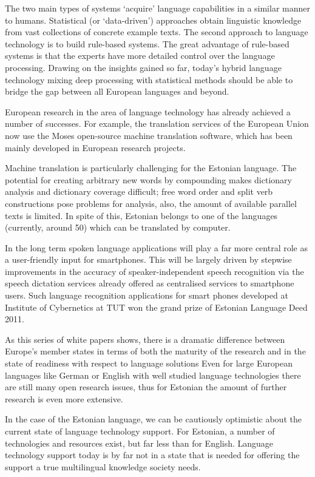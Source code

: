 \begin{multicols}{2}
The two main types of systems ‘acquire’ language capabilities in a similar manner to humans. Statistical (or ‘data-driven’) approaches obtain linguistic knowledge from vast collections of concrete example texts.  The second approach to language technology is to build rule-based systems. The great advantage of rule-based systems is that the experts have more detailed control over the language processing.  Drawing on the insights gained so far, today’s hybrid language technology mixing deep processing with statistical methods should be able to bridge the gap between all European languages and beyond.

European research in the area of language technology has already achieved a number of successes. For example, the translation services of the European Union now use the Moses open-source machine translation software, which has been mainly developed in European research projects. 

Machine translation is particularly challenging for the Estonian language. 
The potential for creating arbitrary new words by compounding makes dictionary analysis and dictionary coverage difficult; free word order and split verb constructions pose problems for analysis, also, the amount of available parallel texts is limited. 
In spite of this, Estonian belongs to one of the languages (currently, around 50) which can be translated by computer.

In the long term spoken language applications will play a far more central role as a user-friendly input for smartphones. This will be largely driven by stepwise improvements in the accuracy of speaker-independent speech recognition via the speech dictation services already offered as centralised services to smartphone users. 
Such language recognition applications for smart phones developed at Institute of Cybernetics at TUT won the grand prize of Estonian Language Deed 2011.


As this series of white papers shows, there is a dramatic difference between Europe’s member states in terms of both the maturity of the research and in the state of readiness with respect to language solutions Even for large European languages like German or English with well studied language technologies there are still many open research issues, thus for Estonian the amount of further research is even more extensive.

In the case of the Estonian language, we can be cautiously optimistic about the current state of language technology support.  For Estonian, a number of technologies and resources exist, but far less than for English.  Language technology support today is by far not in a state that is needed for offering the support a true multilingual knowledge society needs.


\end{multicols}
